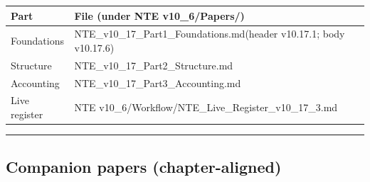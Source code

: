 \documentclass[
  11pt,
]{article}
\newcounter{none} %
\begin{document}
{\def\LTcaptype{none} %
\begin{longtable}[]{@{}
  >{\raggedright\arraybackslash}p{}
  >{\raggedright\arraybackslash}p{}@{}}
\toprule\noalign{}
\begin{minipage}[b]{\linewidth}\raggedright
Part
\end{minipage} & \begin{minipage}[b]{\linewidth}\raggedright
File (under NTE v10\_6/Papers/)
\end{minipage} \\
\midrule\noalign{}
\endhead
\bottomrule\noalign{}
\endlastfoot
Foundations & NTE\_v10\_17\_Part1\_Foundations.md(header v10.17.1; body
v10.17.6) \\
Structure & NTE\_v10\_17\_Part2\_Structure.md \\
Accounting & NTE\_v10\_17\_Part3\_Accounting.md \\
Live register & NTE
v10\_6/Workflow/NTE\_Live\_Register\_v10\_17\_3.md \\
\end{longtable}
}

\begin{center}\rule{0.5\linewidth}{0.5pt}\end{center}

\subsection{Companion papers
(chapter-aligned)}\label{companion-papers-chapter-aligned}
\end{document}
